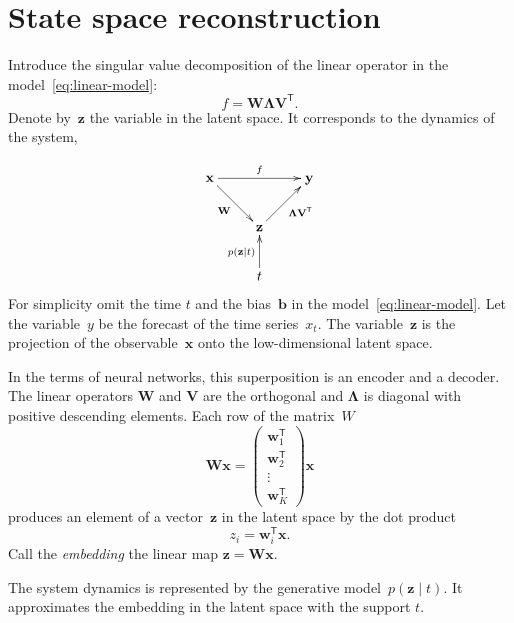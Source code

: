 \documentclass[12pt]{article}
\newcommand{\T}{^{\mathsf{T}}}
\begin{document}
\section{State space reconstruction}
Introduce the singular value decomposition of the linear operator in the model~\eqref{eq:linear-model}:
\[
  f=\mathbf{W}\boldsymbol{\Lambda} \mathbf{V}\T.
\]
Denote by~$\mathbf{z}$ the variable in the latent space. It corresponds to the dynamics of the system,

\begin{equation*}
    \xymatrix{
        \mathbf{x} \ar "1,3"^{f} \ar "2,2"_{\mathbf{W}} & ~  & \mathbf{y} \\%
        ~ & \mathbf{z} \ar "1,3"_{\boldsymbol{\Lambda}\mathbf{V}^\mathsf{T}} & ~ \\
    ~ & t \ar "2,2"^{p(\mathbf{z}|t)} & ~
    }
\end{equation*}
For simplicity omit the time $t$ and the bias~$\mathbf{b}$ in the model~\eqref{eq:linear-model}.
Let the variable~$y$ be the forecast of the time series~$x_t$.
The variable~$\mathbf{z}$ is the projection of the observable~$\mathbf{x}$ onto the low-dimensional latent space.

In the terms of neural networks, this superposition is an encoder and a decoder.
The linear operators $\mathbf{W}$ and $\mathbf{V}$ are the orthogonal and $\boldsymbol{\Lambda}$ is diagonal with positive descending elements.
Each row of the matrix~$W$
\[
\mathbf{W}\mathbf{x} =
    \begin{pmatrix}
        \mathbf{w}_1\T \\ \mathbf{w}_2\T \\ \vdots \\ \mathbf{w}_K\T
    \end{pmatrix} \mathbf{x}
\]
produces an element of a vector~$\mathbf{z}$ in the latent space by the dot product
\[
    z_i = \mathbf{w}_i\T \mathbf{x}.
\]
Call the \emph{embedding} the linear map $\mathbf{z}=\mathbf{W}\mathbf{x}$.

The system dynamics is represented by the generative model~$p(\mathbf{z} \mid t)$.
It approximates the embedding in the latent space with the support $t$.
\end{document}
